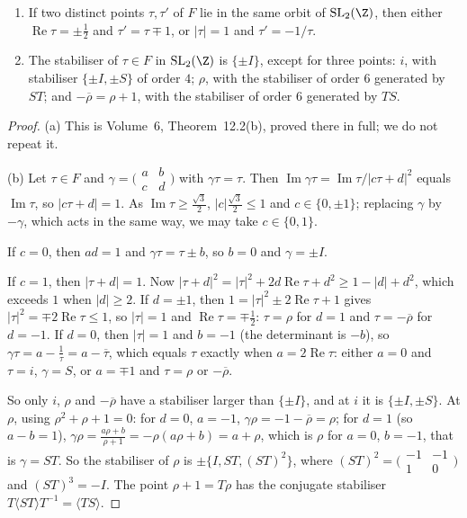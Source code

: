 \begin{theorem}\label{thm:funddomain}
\begin{enumerate}[label=(\alph*)]
\item If two distinct points $\tau,\tau'$ of $F$ lie in the same orbit of $\mathrm{SL}_2(\Z)$, then either $\operatorname{Re}\tau=\pm\frac12$ and $\tau'=\tau\mp1$, or
$|\tau|=1$ and $\tau'=-1/\tau$.
\item The stabiliser of $\tau\in F$ in $\mathrm{SL}_2(\Z)$ is $\{\pm I\}$, except for three points: $i$, with stabiliser $\{\pm I,\pm S\}$ of order $4$; $\rho$, with
the stabiliser of order $6$ generated by $ST$; and $-\overline\rho=\rho+1$, with the stabiliser of order $6$ generated by $TS$.
\end{enumerate}
\end{theorem}
\begin{proof}
(a) This is Volume~6, Theorem~12.2(b), proved there in full; we do not repeat it.

(b) Let $\tau\in F$ and $\gamma=\bigl(\begin{smallmatrix}a&b\\c&d\end{smallmatrix}\bigr)$ with $\gamma\tau=\tau$. Then $\operatorname{Im}\gamma\tau=\operatorname{Im}\tau/|c\tau+d|^2$
equals $\operatorname{Im}\tau$, so $|c\tau+d|=1$. As $\operatorname{Im}\tau\ge\frac{\sqrt3}2$, $|c|\frac{\sqrt3}2\le1$ and $c\in\{0,\pm1\}$; replacing $\gamma$ by $-\gamma$,
which acts in the same way, we may take $c\in\{0,1\}$.

If $c=0$, then $ad=1$ and $\gamma\tau=\tau\pm b$, so $b=0$ and $\gamma=\pm I$.

If $c=1$, then $|\tau+d|=1$. Now $|\tau+d|^2=|\tau|^2+2d\operatorname{Re}\tau+d^2\ge1-|d|+d^2$, which exceeds $1$ when $|d|\ge2$. If $d=\pm1$, then
$1=|\tau|^2\pm2\operatorname{Re}\tau+1$ gives $|\tau|^2=\mp2\operatorname{Re}\tau\le1$, so $|\tau|=1$ and $\operatorname{Re}\tau=\mp\frac12$: $\tau=\rho$ for $d=1$ and
$\tau=-\overline\rho$ for $d=-1$. If $d=0$, then $|\tau|=1$ and $b=-1$ (the determinant is $-b$), so $\gamma\tau=a-\frac1\tau=a-\overline\tau$, which equals $\tau$ exactly
when $a=2\operatorname{Re}\tau$: either $a=0$ and $\tau=i$, $\gamma=S$, or $a=\mp1$ and $\tau=\rho$ or $-\overline\rho$.

So only $i$, $\rho$ and $-\overline\rho$ have a stabiliser larger than $\{\pm I\}$, and at $i$ it is $\{\pm I,\pm S\}$. At $\rho$, using $\rho^2+\rho+1=0$: for $d=0$, $a=-1$, $\gamma\rho=-1-\overline\rho=\rho$; for $d=1$ (so $a-b=1$),
$\gamma\rho=\frac{a\rho+b}{\rho+1}=-\rho(a\rho+b)=a+\rho$, which is $\rho$ for $a=0$, $b=-1$, that is $\gamma=ST$. So the stabiliser of $\rho$ is
$\pm\{I,ST,(ST)^2\}$, where $(ST)^2=\bigl(\begin{smallmatrix}-1&-1\\1&0\end{smallmatrix}\bigr)$ and $(ST)^3=-I$. The point $\rho+1=T\rho$ has the conjugate
stabiliser $T\langle ST\rangle T^{-1}=\langle TS\rangle$.
\end{proof}

